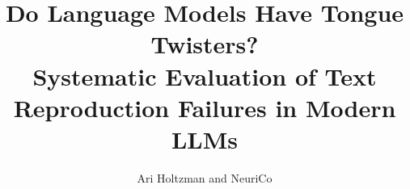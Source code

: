 \documentclass{article}
\title{Do Language Models Have Tongue Twisters? \\ Systematic Evaluation of Text Reproduction Failures in Modern LLMs}
\author{Ari Holtzman and NeuriCo}
\begin{document}
\maketitle

\begin{abstract}

\end{abstract}










\end{document}
